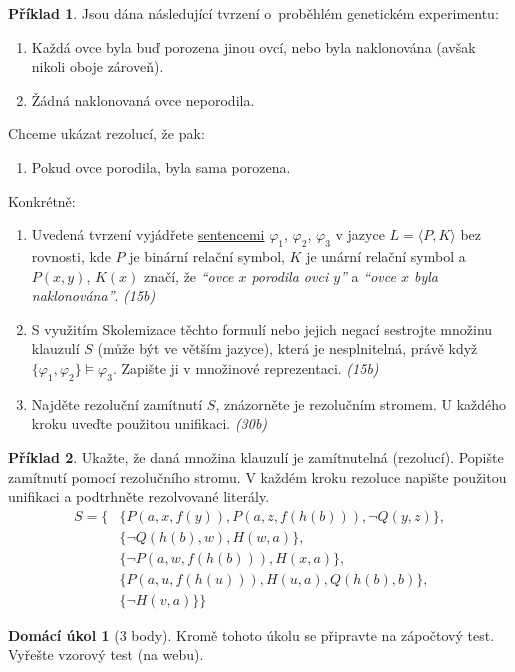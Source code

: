 \documentclass[a4paper]{article}
\theoremstyle{definition}
\newtheorem{problem}{Příklad}
\newtheorem*{ukol}{Domácí úkol}
\begin{document}
\medskip\begin{problem}
Jsou dána následující tvrzení o~proběhlém genetickém experimentu:
\begin{enumerate}[label=(\roman*)]\it
    \item Každá ovce byla buď porozena jinou ovcí, nebo byla naklonována (avšak nikoli oboje zároveň).
    \item Žádná naklonovaná ovce neporodila.
\end{enumerate}
Chceme ukázat rezolucí, že pak:
\begin{enumerate}[label=(\roman*)]\it
    \setcounter{enumi}{2}
    \item Pokud ovce porodila, byla sama porozena.
\end{enumerate}
Konkrétně:
\begin{enumerate}
    \item Uvedená tvrzení vyjádřete \underline{sentencemi} $\varphi_1$, $\varphi_2$, $\varphi_3$ v jazyce $L=\langle P,K\rangle$ bez rovnosti, kde $P$ je binární relační symbol, $K$ je unární relační symbol a $P(x,y)$, $K(x)$ značí, že \emph{``ovce $x$ porodila ovci $y$''} a \emph{``ovce $x$ byla naklonována''}. {\it (15b)}    
    \item S využitím Skolemizace těchto formulí nebo jejich negací sestrojte množinu klauzulí $S$ (může být ve větším jazyce), která je nesplnitelná, právě když  $\{\varphi_1, \varphi_2\} \models \varphi_3$. Zapište ji v množinové reprezentaci. {\it (15b)}
    \item Najděte rezoluční zamítnutí $S$, znázorněte je rezolučním stromem. U každého kroku uveďte použitou unifikaci. {\it (30b)}
\end{enumerate}
\end{problem}
        
    
\medskip\begin{problem}
    Ukažte, že daná množina klauzulí je zamítnutelná (rezolucí). Popište zamítnutí pomocí rezolučního stromu. V každém kroku rezoluce napište použitou unifikaci a podtrhněte rezolvované literály.
    \begin{align*}
        S=\{
            &\{P(a,x,f(y)),P(a,z,f(h(b))),\neg Q(y,z)\},\\
            &\{\neg Q(h(b),w),H(w,a)\},\\
            &\{\neg P(a,w,f(h(b))),H(x,a)\},\\
            &\{P(a,u,f(h(u))),H(u,a),Q(h(b),b)\},\\
            &\{\neg H(v,a)\}
        \}
    \end{align*}
\end{problem}


\medskip\begin{ukol}[3 body]


Kromě tohoto úkolu se připravte na zápočtový test. Vyřešte vzorový test (na webu).
\end{ukol}
\end{document}
